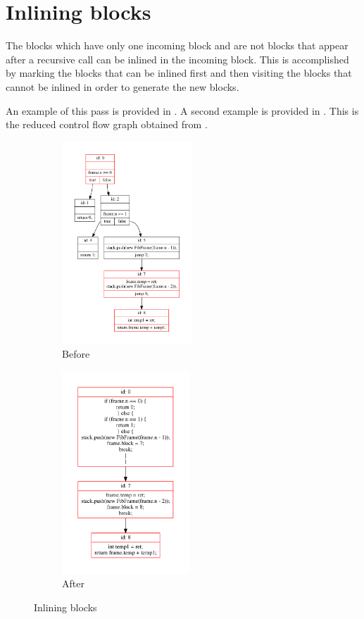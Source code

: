 \section{Inlining blocks}

The blocks which have only one incoming block and are not blocks that appear after a recursive call can be inlined in
the incoming block. This is accomplished by marking the blocks that can be inlined first and then visiting the blocks
that cannot be inlined in order to generate the new blocks.

An example of this pass is provided in . A second example is provided in
. This is the reduced control flow graph obtained from
.

\begin{figure}[htb]
    \begin{subfigure}[b]{.5\textwidth}
        \centering
        \includegraphics[height=3in]{src/graph/inline-before.pdf}
        \caption{Before}
    \end{subfigure}
    \begin{subfigure}[b]{.5\textwidth}
        \centering
        \includegraphics[height=3in]{src/graph/inline-after.pdf}
        \caption{After}
    \end{subfigure}
    \caption{Inlining blocks \label{img:inline-blocks}}
\end{figure}

